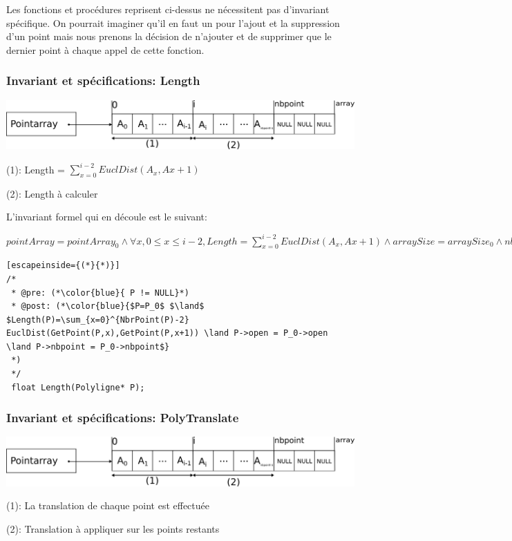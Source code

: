 \documentclass[a4paper, 11pt, oneside]{article}
\begin{document}
Les fonctions et procédures reprisent ci-dessus ne nécessitent pas d'invariant spécifique. On pourrait imaginer qu'il en faut un pour l'ajout et la suppression d'un point mais nous prenons la décision de n'ajouter et de supprimer que le dernier point à chaque appel de cette fonction. 

\subsubsection{Invariant et spécifications: Length}

\includegraphics[scale=0.8]{inv1.png}

(1): Length = $\sum_{x=0}^{i-2} EuclDist(A_x,Ax+1)$

(2): Length à calculer

\noindent L'invariant formel qui en découle est le suivant:

\noindent$ pointArray = pointArray_0 \land \forall x, 0\leq x \leq i-2, Length =\sum_{x=0}^{i-2} EuclDist(A_x,Ax+1) \land arraySize = arraySize_0 \land nbpoint = nbpoint_0 $

\smallskip



\begin{lstlisting}[escapeinside={(*}{*)}]
/*
 * @pre: (*\color{blue}{ P != NULL}*)
 * @post: (*\color{blue}{$P=P_0$ $\land$ $Length(P)=\sum_{x=0}^{NbrPoint(P)-2} EuclDist(GetPoint(P,x),GetPoint(P,x+1)) \land P->open = P_0->open \land P->nbpoint = P_0->nbpoint$}
 *)
 */
 float Length(Polyligne* P);
\end{lstlisting}

\subsubsection{Invariant et spécifications: PolyTranslate}

\includegraphics[scale=0.8]{inv1.png}

(1): La translation de chaque point est effectuée

(2): Translation à appliquer sur les points restants
\end{document}
